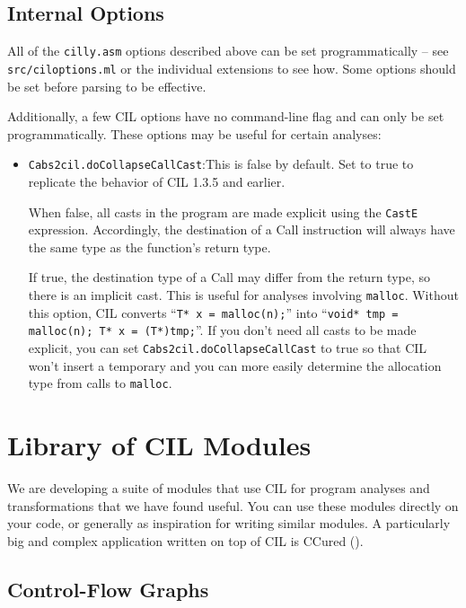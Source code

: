 \documentclass{article}
\def\t#1{{\tt #1}}
\begin{document}
\subsection{Internal Options}
\label{sec-cilly-internal-options}

All of the \t{cilly.asm} options described above can be set
programmatically -- see \t{src/ciloptions.ml} or the individual
extensions to see how.  Some options should be set before parsing to
be effective.  

Additionally, a few CIL options have no command-line flag and can only
be set programmatically.  These options may be useful for certain
analyses:

\begin{itemize}
\item \t{Cabs2cil.doCollapseCallCast}:This is false by default.  Set
to true to replicate the behavior of CIL 1.3.5 and earlier.

When false, all casts in the program are made explicit using the
\t{CastE} expression. Accordingly, the destination of a Call
instruction will always have the same type as the function's return
type.

If true, the destination type of a Call may differ from the return type, so
there is an implicit cast.  This is useful for analyses involving
\t{malloc}.  Without this option, CIL converts ``\t{T* x = malloc(n);}''
into ``\t{void* tmp = malloc(n); T* x = (T*)tmp;}''.  If you don't
need all casts to be made explicit, you can set
\t{Cabs2cil.doCollapseCallCast} to true so that CIL won't insert a
temporary and you can more easily determine the allocation type from
calls to \t{malloc}.


\end{itemize}



\section{Library of CIL Modules} \label{sec-Extension}

 We are developing a suite of modules that use CIL for program analyses and
transformations that we have found useful. You can use these modules directly
on your code, or generally as inspiration for writing similar modules. A
particularly big and complex application written on top of CIL is CCured
().

\subsection{Control-Flow Graphs} \label{sec-cfg}
\end{document}
